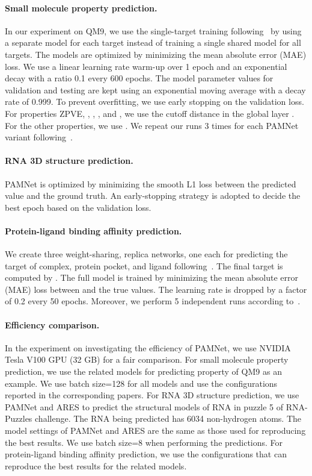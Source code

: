 \documentclass[fleqn,10pt]{wlscirep}
\newcommand{\method}{PAMNet\xspace}
\begin{document}
\paragraph{Small molecule property prediction.}
In our experiment on QM9, we use the single-target training following~\cite{klicpera_dimenet_2020} by using a separate model for each target instead of training a single shared model for all targets. The models are optimized by minimizing the mean absolute error (MAE) loss. We use a linear learning rate warm-up over 1 epoch and an exponential decay with a ratio 0.1 every 600 epochs. The model parameter values for validation and testing are kept using an exponential moving average with a decay rate of 0.999. To prevent overfitting, we use early stopping on the validation loss. For properties ZPVE, , , , and , we use the cutoff distance in the global layer . For the other properties, we use . We repeat our runs 3 times for each \method variant following~\cite{anderson2019cormorant}. 

\paragraph{RNA 3D structure prediction.}
\method is optimized by minimizing the smooth L1 loss\cite{ren2015faster} between the predicted value and the ground truth. An early-stopping strategy is adopted to decide the best epoch based on the validation loss.

\paragraph{Protein-ligand binding affinity prediction.}
We create three weight-sharing, replica networks, one each for predicting the target  of complex, protein pocket, and ligand following~\cite{gomes2017atomic}. The final target is computed by . The full model is trained by minimizing the mean absolute error (MAE) loss between  and the true values. The learning rate is dropped by a factor of 0.2 every 50 epochs. Moreover, we perform 5 independent runs according to~\cite{li2021structure}.

\paragraph{Efficiency comparison. }
In the experiment on investigating the efficiency of \method, we use NVIDIA Tesla V100 GPU (32 GB) for a fair comparison. For small molecule property prediction, we use the related models for predicting property  of QM9 as an example. We use batch size=128 for all models and use the configurations reported in the corresponding papers. For RNA 3D structure prediction, we use \method and ARES to predict the structural models of RNA in puzzle 5 of RNA-Puzzles challenge. The RNA being predicted has 6034 non-hydrogen atoms. The model settings of \method and ARES are the same as those used for reproducing the best results. We use batch size=8 when performing the predictions. For protein-ligand binding affinity prediction, we use the configurations that can reproduce the best results for the related models.
\end{document}
